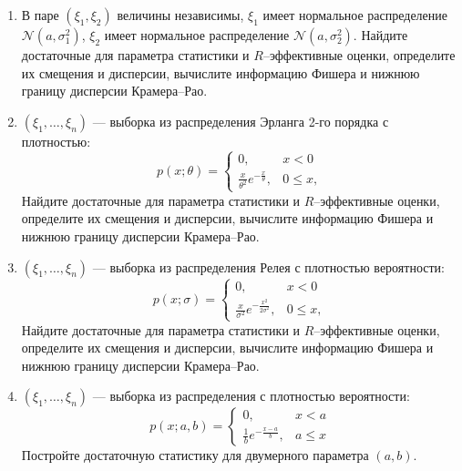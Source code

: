 \documentclass[a4paper,12pt]{article}
\newcommand{\sample}[2]{\left( #1_1, \dots, #1_{#2} \right)}
\begin{document}
\begin{enumerate}[topsep=1cm, parsep=1cm, resume]
        \item В паре $(\xi_1, \xi_2)$ величины независимы, $\xi_1$ имеет нормальное распределение $\mathcal{N}(a, \sigma_1^2)$, $\xi_2$ имеет
              нормальное распределение $\mathcal{N}(a, \sigma_2^2)$. Найдите достаточные для параметра статистики и $R$--эффективные оценки,
              определите их смещения и дисперсии, вычислите информацию Фишера и нижнюю границу дисперсии Крамера--Рао.

        \item $\sample{\xi}{n}$ --- выборка из распределения Эрланга 2-го порядка с плотностью:
              \[
                  p(x; \theta)
                  = \left \{
                  \begin{array}{ll}
                      0,                                        & x < 0    \\
                      \frac{x}{\theta^2} e^{-\frac{x}{\theta}}, & 0 \le x,
                  \end{array}
                  \right .
              \]
              Найдите достаточные для параметра статистики и $R$--эффективные оценки, определите их смещения и дисперсии, вычислите информацию Фишера
              и нижнюю границу дисперсии Крамера--Рао.

        \item $\sample{\xi}{n}$ --- выборка из распределения Релея с плотностью вероятности:
              \[
                  p(x; \sigma)
                  = \left \{
                  \begin{array}{ll}
                      0,                                              & x < 0    \\
                      \frac{x}{\sigma^2} e^{-\frac{x^2}{2 \sigma^2}}, & 0 \le x,
                  \end{array}
                  \right .
              \]
              Найдите достаточные для параметра статистики и $R$--эффективные оценки, определите их смещения и дисперсии, вычислите информацию Фишера
              и нижнюю границу дисперсии Крамера--Рао.

              \item $\sample{\xi}{n}$ --- выборка из распределения с плотностью вероятности:
              \[
                  p(x; a, b)
                  = \left \{
                  \begin{array}{ll}
                      0,                              & x < a   \\
                      \frac{1}{b} e^{-\frac{x-a}{b}}, & a \le x
                  \end{array}
                  \right .
              \]
              Постройте достаточную статистику для двумерного параметра $(a,b)$.


\end{enumerate}
\end{document}
